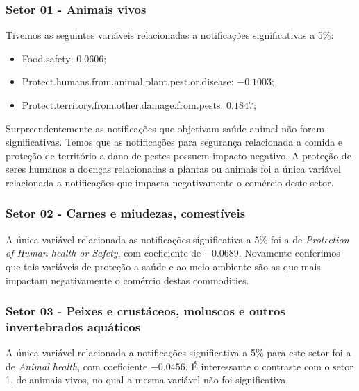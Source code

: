 \subsubsection{Setor 01 - Animais vivos}


 

Tivemos as seguintes variáveis relacionadas a notificações significativas a 5\%:
\begin{itemize}
    \item Food.safety: $0.0606$;
    \item Protect.humans.from.animal.plant.pest.or.disease: $-0.1003$;
    \item Protect.territory.from.other.damage.from.pests: $0.1847$;
\end{itemize}

Surpreendentemente as notificações que objetivam saúde animal não foram significativas. Temos que as notificações para segurança relacionada a comida e proteção de território a dano de pestes possuem impacto negativo. A proteção de seres humanos a doenças relacionadas a plantas ou animais foi a única variável relacionada a notificações que impacta negativamente o comércio deste setor. 

\subsubsection{Setor 02 - Carnes e miudezas, comestíveis}


 

A única variável relacionada as notificações significativa a 5\% foi a de \emph{Protection of Human health or Safety}, com coeficiente de $-0.0689$. Novamente conferimos que tais variáveis de proteção a saúde e ao meio ambiente são as que mais impactam negativamente o comércio destas commodities.

\newpage

\subsubsection{Setor 03 - Peixes e crustáceos, moluscos e outros invertebrados aquáticos}


 


A única variável relacionada a notificações significativa a 5\% para este setor foi a de \emph{Animal health}, com coeficiente $-0.0456$. É interessante o contraste com o setor 1, de animais vivos, no qual a mesma variável não foi significativa. 

